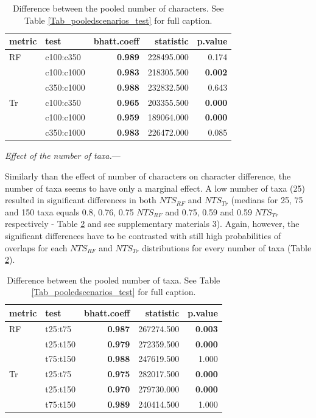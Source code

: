 \documentclass[12pt,letterpaper]{article}
\renewcommand{\subsubsection}[1]{%
\vspace{2ex}
\noindent
\textit{#1.}---}
\begin{document}
\begin{table}[ht]
\centering
\begin{tabular}{ll|r|rr}
  \hline
metric & test & bhatt.coeff & statistic & p.value \\ 
  \hline
RF & c100:c350 & \textbf{0.989} & 228495.000 & 0.174 \\ 
   & c100:c1000 & \textbf{0.983} & 218305.500 & \textbf{0.002} \\ 
   & c350:c1000 & \textbf{0.988} & 232832.500 & 0.643 \\ 
  Tr & c100:c350 & \textbf{0.965} & 203355.500 & \textbf{0.000} \\ 
   & c100:c1000 & \textbf{0.959} & 189064.000 & \textbf{0.000} \\ 
   & c350:c1000 & \textbf{0.983} & 226472.000 & 0.085 \\ 
   \hline
\end{tabular}
\caption{Difference between the pooled number of characters. See Table \ref{Tab_pooledscenarios_test} for full caption.} 
\label{Tab_pooledscharacters_test}
\end{table}

\subsubsection{Effect of the number of taxa}

Similarly than the effect of number of characters on character difference, the number of taxa seems to have only a marginal effect.
A low number of taxa (25) resulted in significant differences in both $NTS_{RF}$ and $NTS_{Tr}$ (medians for 25, 75 and 150 taxa equals 0.8, 0.76, 0.75 $NTS_{RF}$ and 0.75, 0.59 and 0.59 $NTS_{Tr}$respectively - Table \ref{Tab_pooledstaxa_test} and see supplementary materials 3).
Again, however, the significant differences have to be contrasted with still high probabilities of overlaps for each $NTS_{RF}$ and $NTS_{Tr}$ distributions for every number of taxa (Table \ref{Tab_pooledstaxa_test}).

\begin{table}[ht]
\centering
\begin{tabular}{ll|r|rr}
  \hline
metric & test & bhatt.coeff & statistic & p.value \\ 
  \hline
RF & t25:t75 & \textbf{0.987} & 267274.500 & \textbf{0.003} \\ 
   & t25:t150 &\textbf{0.979} & 272359.500 & \textbf{0.000} \\ 
   & t75:t150 & \textbf{0.988} & 247619.500 & 1.000 \\ 
Tr & t25:t75 & \textbf{0.975} & 282017.500 & \textbf{0.000} \\ 
   & t25:t150 & \textbf{0.970} & 279730.000 & \textbf{0.000} \\ 
   & t75:t150 & \textbf{0.989} & 240414.500 & 1.000 \\ 
   \hline
\end{tabular}
\caption{Difference between the pooled number of taxa. See Table \ref{Tab_pooledscenarios_test} for full caption.} 
\label{Tab_pooledstaxa_test}
\end{table}
\end{document}
